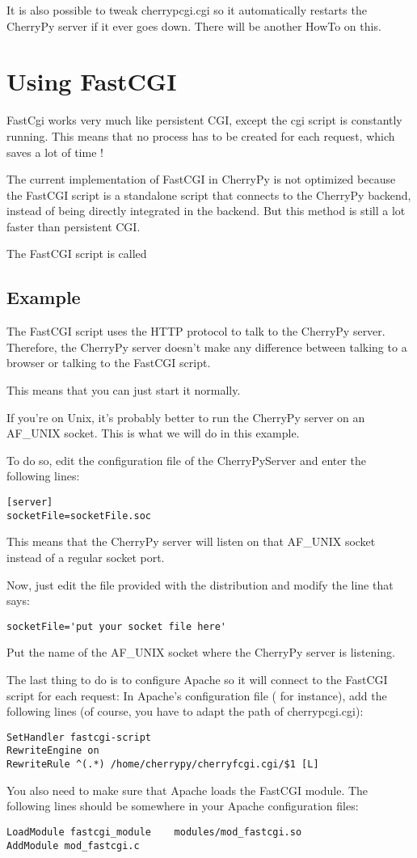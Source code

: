 \documentclass{manual}
\begin{document}
It is also possible to tweak cherrypcgi.cgi so it automatically restarts the CherryPy server if it ever goes down.
There will be another HowTo on this.

\section{Using FastCGI}

FastCgi works very much like persistent CGI, except the cgi script is constantly running. This means that no process
has to be created for each request, which saves a lot of time !

The current implementation of FastCGI in CherryPy is not optimized because the FastCGI script is a standalone script
that connects to the CherryPy backend, instead of being directly integrated in the backend. But this method is still a
lot faster than persistent CGI.

The FastCGI script is called 

\subsection{Example}
The FastCGI script uses the HTTP protocol to talk to the CherryPy server. Therefore, the CherryPy server
doesn't make any difference between talking to a browser or talking to the FastCGI script.

This means that you can just start it normally.

If you're on Unix, it's probably better to run the CherryPy server on an AF_UNIX socket. This is what we will
do in this example.

To do so, edit the configuration file of the CherryPyServer and enter the following lines:
\begin{verbatim}
[server]
socketFile=socketFile.soc
\end{verbatim}
This means that the CherryPy server will listen on that AF_UNIX socket instead of a regular socket port.

Now, just edit the  file provided with the distribution and modify the line that says:
\begin{verbatim}
socketFile='put your socket file here'
\end{verbatim}
Put the name of the AF_UNIX socket where the CherryPy server is listening.

The last thing to do is to configure Apache so it will connect to the FastCGI script for each request:
In Apache's configuration file ( for instance), add the following lines (of course, you have
to adapt the path of cherrypcgi.cgi):
\begin{verbatim}
SetHandler fastcgi-script
RewriteEngine on
RewriteRule ^(.*) /home/cherrypy/cherryfcgi.cgi/$1 [L]
\end{verbatim}
You also need to make sure that Apache loads the FastCGI module. The following lines should be somewhere in your Apache configuration files:
\begin{verbatim}
LoadModule fastcgi_module    modules/mod_fastcgi.so
AddModule mod_fastcgi.c
\end{verbatim}
\end{document}
